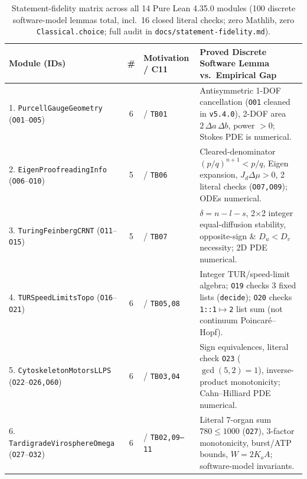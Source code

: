 \documentclass[11pt,reqno]{amsart}
\begin{document}
\begin{table}[t]
\centering
\caption{Statement-fidelity matrix across all 14 Pure Lean 4.35.0 modules (100 discrete software-model lemmas total, incl.\ 16 closed literal checks; zero Mathlib, zero \texttt{Classical.choice}; full audit in \nolinkurl{docs/statement-fidelity.md}).}
\label{tab:fidelity}
\scriptsize
\setlength{\tabcolsep}{3.5pt}
\renewcommand{\arraystretch}{0.92}
\begin{tabularx}{\textwidth}{@{}l c l L@{}}
\toprule
\textbf{Module (IDs)} & \textbf{\#} & \textbf{Motivation / C11} & \textbf{Proved Discrete Software Lemma vs.\ Empirical Gap} \\
. \texttt{PurcellGaugeGeometry} (\texttt{O01}--\texttt{O05}) & 6 & \cite{purcell1977life} / \texttt{TB01} & Antisymmetric 1-DOF cancellation (\texttt{O01} cleaned in \texttt{v5.4.0}), 2-DOF area $2\,\Delta a\,\Delta b$, power $>0$; Stokes PDE is numerical. \\
2. \texttt{EigenProofreadingInfo} (\texttt{O06}--\texttt{O10}) & 5 & \cite{hopfield1974kinetic,ninio1975kinetic,eigen1971selforganization} / \texttt{TB06} & Cleared-denominator $(p/q)^{n+1} < p/q$, Eigen expansion, $J_d \Delta\mu > 0$, 2 literal checks (\texttt{O07,O09}); ODEs numerical. \\
3. \texttt{TuringFeinbergCRNT} (\texttt{O11}--\texttt{O15}) & 5 & \cite{turing1952chemical,feinberg1987chemical} / \texttt{TB07} & $\delta = n-l-s$, 2$\times$2 integer equal-diffusion stability, opposite-sign \& $D_u < D_v$ necessity; 2D PDE numerical. \\
4. \texttt{TURSpeedLimitsTopo} (\texttt{O16}--\texttt{O21}) & 6 & \cite{barato2015thermodynamic,marques2014min} / \texttt{TB05,08} & Integer TUR/speed-limit algebra; \texttt{O19} checks 3 fixed lists (\texttt{decide}); \texttt{O20} checks \texttt{1::1}$\mapsto$\texttt{2} list sum (not continuum Poincar\'e--Hopf). \\
5. \texttt{CytoskeletonMotorsLLPS} (\texttt{O22}--\texttt{O26,O60}) & 6 & \cite{dogterom1993physical,holy1997assembly,santiveri2020structure,zwicker2015suppression} / \texttt{TB03,04} & Sign equivalences, literal check \texttt{O23} ($\gcd(5,2)=1$), inverse-product monotonicity; Cahn--Hilliard PDE numerical. \\
6. \texttt{TardigradeVirosphereOmega} (\texttt{O27}--\texttt{O32}) & 6 & \cite{smith2016compact,polilov2012smallest,hashimoto2016extremotolerant,fischer2016host,lynch2015bioenergetic,scheibner2020odd} / \texttt{TB02,09--11} & Literal 7-organ sum $780 \le 1000$ (\texttt{O27}), 3-factor monotonicity, burst/ATP bounds, $W = 2K_o A$; software-model invariants. \\

\end{tabularx}
\end{table}
\end{document}
